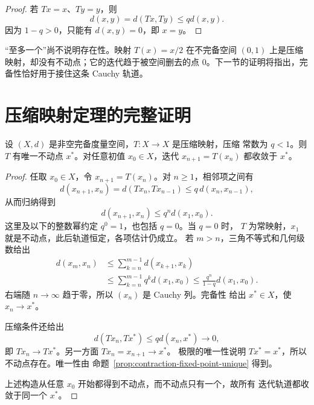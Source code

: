 \begin{proof}
若 \(Tx=x\)、\(Ty=y\)，则
\[
 d(x,y)=d(Tx,Ty)\le qd(x,y).
\]
因为 \(1-q>0\)，只能有 \(d(x,y)=0\)，即 \(x=y\)。
\end{proof}

“至多一个”尚不说明存在性。映射 \(T(x)=x/2\) 在不完备空间
\((0,1)\) 上是压缩映射，却没有不动点；它的迭代趋于被空间删去的点
\(0\)。下一节的证明将指出，完备性恰好用于接住这条 Cauchy 轨道。

\section{压缩映射定理的完整证明}

\begin{theorem}
\label{thm:banach-contraction}
设 \((X,d)\) 是非空完备度量空间，\(T:X\to X\) 是压缩映射，压缩
常数为 \(q<1\)。则 \(T\) 有唯一不动点 \(x^\ast\)。对任意初值
\(x_0\in X\)，迭代 \(x_{n+1}=T(x_n)\) 都收敛于 \(x^\ast\)。
\end{theorem}

\begin{proof}
任取 \(x_0\in X\)，令 \(x_{n+1}=T(x_n)\)。对 \(n\ge1\)，相邻项之间有
\[
 d(x_{n+1},x_n)
 =d(Tx_n,Tx_{n-1})
 \le q\,d(x_n,x_{n-1}),
\]
从而归纳得到
\begin{equation}
\label{eq:contraction-successive-step}
 d(x_{n+1},x_n)\le q^n d(x_1,x_0).
\end{equation}
这里及以下的整数幂约定 \(q^0=1\)，也包括 \(q=0\)。当 \(q=0\) 时，
\(T\) 为常映射，\(x_1\) 就是不动点，此后轨道恒定，各项估计仍成立。
若 \(m>n\)，三角不等式和几何级数给出
\begin{equation}
\label{eq:contraction-cauchy-tail}
\begin{aligned}
 d(x_m,x_n)
 &\le \sum_{k=n}^{m-1}d(x_{k+1},x_k)\\
 &\le \sum_{k=n}^{m-1}q^k d(x_1,x_0)
 \le \frac{q^n}{1-q}d(x_1,x_0).
\end{aligned}
\end{equation}
右端随 \(n\to\infty\) 趋于零，所以 \((x_n)\) 是 Cauchy 列。完备性
给出 \(x^\ast\in X\)，使 \(x_n\to x^\ast\)。

压缩条件还给出
\[
 d(Tx_n,Tx^\ast)\le qd(x_n,x^\ast)\longrightarrow0,
\]
即 \(Tx_n\to Tx^\ast\)。另一方面 \(Tx_n=x_{n+1}\to x^\ast\)。
极限的唯一性说明 \(Tx^\ast=x^\ast\)，所以不动点存在。唯一性由
命题~\ref{prop:contraction-fixed-point-unique} 得到。

上述构造从任意 \(x_0\) 开始都得到不动点，而不动点只有一个，故所有
迭代轨道都收敛于同一个 \(x^\ast\)。
\end{proof}

